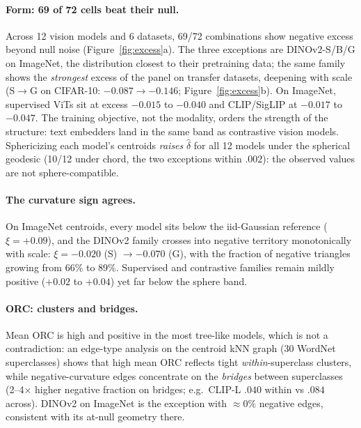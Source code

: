 \documentclass{article} %
\begin{document}
\paragraph{Form: 69 of 72 cells beat their null.} Across 12 vision models and 6 datasets, 69/72 combinations show negative excess beyond null noise (Figure~\ref{fig:excess}a). The three exceptions are DINOv2-S/B/G on ImageNet, the distribution closest to their pretraining data; the same family shows the \emph{strongest} excess of the panel on transfer datasets, deepening with scale (S$\to$G on CIFAR-10: $-0.087 \to -0.146$; Figure~\ref{fig:excess}b). On ImageNet, supervised ViTs sit at excess $-0.015$ to $-0.040$ and CLIP/SigLIP at $-0.017$ to $-0.047$. The training objective, not the modality, orders the strength of the structure: text embedders land in the same band as contrastive vision models. %
Sphericizing each model's centroids \emph{raises} $\hat\delta$ for all 12 models under the spherical geodesic (10/12 under chord, the two exceptions within $.002$): the observed values are not sphere-compatible. %

\paragraph{The curvature sign agrees.} On ImageNet centroids, every model sits below the iid-Gaussian reference ($\xi = +0.09$), and the DINOv2 family crosses into negative territory monotonically with scale: $\xi = -0.020$ (S) $\to -0.070$ (G), with the fraction of negative triangles growing from 66\% to 89\%. Supervised and contrastive families remain mildly positive ($+0.02$ to $+0.04$) yet far below the sphere band. %

\paragraph{ORC: clusters and bridges.} Mean ORC is high and positive in the most tree-like models, which is not a contradiction: an edge-type analysis on the centroid kNN graph (30 WordNet superclasses) shows that high mean ORC reflects tight \emph{within}-superclass clusters, while negative-curvature edges concentrate on the \emph{bridges} between superclasses (2--4$\times$ higher negative fraction on bridges; e.g.\ CLIP-L $.040$ within vs $.084$ across). DINOv2 on ImageNet is the exception with $\approx 0\%$ negative edges, consistent with its at-null geometry there. %
\end{document}
